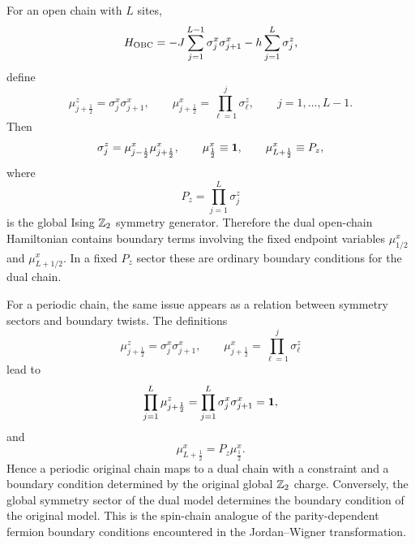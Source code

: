 For an open chain with $L$ sites,
\begin{equation}
\label{eq:duality-open-tfim}
    H_{\rm OBC}
    =
    -J\sum_{j=1}^{L-1}\sigma_j^x\sigma_{j+1}^x
    -h\sum_{j=1}^{L}\sigma_j^z,
\end{equation}
define
\begin{equation}
\label{eq:duality-open-definitions}
    \mu_{j+\frac12}^z=\sigma_j^x\sigma_{j+1}^x,
    \qquad
    \mu_{j+\frac12}^x=\prod_{\ell=1}^{j}\sigma_\ell^z,
    \qquad
    j=1,\ldots,L-1.
\end{equation}
Then
\begin{equation}
\label{eq:duality-open-boundary-identities}
    \sigma_j^z
    =
    \mu_{j-\frac12}^x\mu_{j+\frac12}^x,
    \qquad
    \mu_{\frac12}^x\equiv\mathbf{1},
    \qquad
    \mu_{L+\frac12}^x\equiv P_z,
\end{equation}
where
\begin{equation}
\label{eq:duality-global-z2-charge}
    P_z=\prod_{j=1}^{L}\sigma_j^z
\end{equation}
is the global Ising $\mathbb{Z}_2$ symmetry generator.  Therefore the dual open-chain
Hamiltonian contains boundary terms involving the fixed endpoint variables
$\mu_{1/2}^x$ and $\mu_{L+1/2}^x$.  In a fixed $P_z$ sector these are ordinary
boundary conditions for the dual chain.

For a periodic chain, the same issue appears as a relation between symmetry
sectors and boundary twists.  The definitions
\begin{equation}
\label{eq:duality-periodic-definitions}
    \mu_{j+\frac12}^z=\sigma_j^x\sigma_{j+1}^x,
    \qquad
    \mu_{j+\frac12}^x=\prod_{\ell=1}^{j}\sigma_\ell^z
\end{equation}
lead to
\begin{equation}
\label{eq:duality-periodic-constraint}
    \prod_{j=1}^{L}\mu_{j+\frac12}^z
    =
    \prod_{j=1}^{L}\sigma_j^x\sigma_{j+1}^x
    =
    \mathbf{1},
\end{equation}
and
\begin{equation}
\label{eq:duality-periodic-twist}
    \mu_{L+\frac12}^x=P_z\mu_{\frac12}^x .
\end{equation}
Hence a periodic original chain maps to a dual chain with a constraint and a
boundary condition determined by the original global $\mathbb{Z}_2$ charge.  Conversely,
the global symmetry sector of the dual model determines the boundary condition
of the original model.  This is the spin-chain analogue of the parity-dependent
fermion boundary conditions encountered in the Jordan--Wigner transformation.

